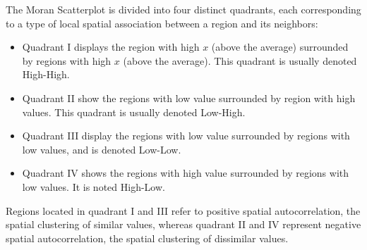 \documentclass[english,12pt]{book}\usepackage[]{graphicx}\usepackage[]{xcolor}
\begin{document}
The Moran Scatterplot is divided into four distinct quadrants, each corresponding to a type of local spatial association between a region and its neighbors:

\begin{itemize}
  \item Quadrant I displays the region with high $x$ (above the average) surrounded by regions with high $x$ (above the average). This quadrant is usually  denoted High-High.
  \item Quadrant II show the regions with low value surrounded by region with high values. This quadrant is usually denoted Low-High.
  \item Quadrant III display the regions with low value surrounded by regions with low values, and is denoted Low-Low.
  \item Quadrant IV shows the regions with high value surrounded by regions with low values. It is noted High-Low.
\end{itemize}

Regions located in quadrant I and III refer to positive spatial autocorrelation, the spatial clustering of similar values, whereas quadrant II and IV represent negative spatial autocorrelation, the spatial clustering of dissimilar values. 
\end{document}

